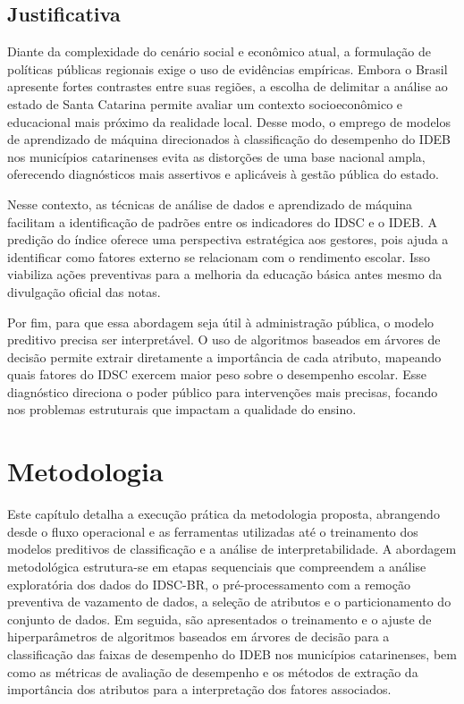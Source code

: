 \section{Justificativa}

Diante da complexidade do cenário social e econômico atual, a formulação de políticas públicas regionais exige o uso de evidências empíricas. Embora o Brasil apresente fortes contrastes entre suas regiões, a escolha de delimitar a análise ao estado de Santa Catarina permite avaliar um contexto socioeconômico e educacional mais próximo da realidade local. Desse modo, o emprego de modelos de aprendizado de máquina direcionados à classificação do desempenho do IDEB nos municípios catarinenses evita as distorções de uma base nacional ampla, oferecendo diagnósticos mais assertivos e aplicáveis à gestão pública do estado.

Nesse contexto, as técnicas de análise de dados e aprendizado de máquina facilitam a identificação de padrões entre os indicadores do IDSC e o IDEB. A predição do índice oferece uma perspectiva estratégica aos gestores, pois ajuda a identificar como fatores externo se relacionam com o rendimento escolar. Isso viabiliza ações preventivas para a melhoria da educação básica antes mesmo da divulgação oficial das notas.

Por fim, para que essa abordagem seja útil à administração pública, o modelo preditivo precisa ser interpretável. O uso de algoritmos baseados em árvores de decisão permite extrair diretamente a importância de cada atributo, mapeando quais fatores do IDSC exercem maior peso sobre o desempenho escolar. Esse diagnóstico direciona o poder público para intervenções mais precisas, focando nos problemas estruturais que impactam a qualidade do ensino.

\chapter{Metodologia}

Este capítulo detalha a execução prática da metodologia proposta, abrangendo desde o fluxo operacional e as ferramentas utilizadas até o treinamento dos modelos preditivos de classificação e a análise de interpretabilidade. A abordagem metodológica estrutura-se em etapas sequenciais que compreendem a análise exploratória dos dados do IDSC-BR, o pré-processamento com a remoção preventiva de vazamento de dados, a seleção de atributos e o particionamento do conjunto de dados. Em seguida, são apresentados o treinamento e o ajuste de hiperparâmetros de algoritmos baseados em árvores de decisão para a classificação das faixas de desempenho do IDEB nos municípios catarinenses, bem como as métricas de avaliação de desempenho e os métodos de extração da importância dos atributos para a interpretação dos fatores associados.

